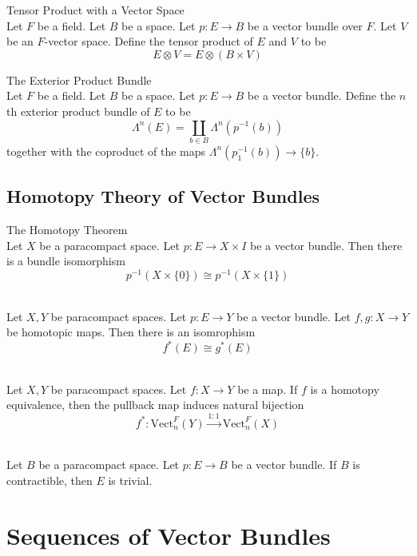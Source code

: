 \documentclass[a4paper]{article}
\begin{document}
\begin{defn}{Tensor Product with a Vector Space}{}\\
Let $F$ be a field. Let $B$ be a space. Let $p:E\to B$ be a vector bundle over $F$. Let $V$ be an $F$-vector space. Define the tensor product of $E$ and $V$ to be $$E\otimes V=E\otimes(B\times V)$$
\end{defn}

\begin{defn}{The Exterior Product Bundle}{}\\
Let $F$ be a field. Let $B$ be a space. Let $p:E\to B$ be a vector bundle. Define the $n$th exterior product bundle of $E$ to be $$\Lambda^n(E)=\coprod_{b\in B}\Lambda^n(p^{-1}(b))$$  together with the coproduct of the maps $\Lambda^n(p_1^{-1}(b))\to\{b\}$. 
\end{defn}

\subsection{Homotopy Theory of Vector Bundles}
\begin{thm}{The Homotopy Theorem}{}\\
Let $X$ be a paracompact space. Let $p:E\to X\times I$ be a vector bundle. Then there is a bundle isomorphism $$p^{-1}(X\times\{0\})\cong p^{-1}(X\times\{1\})$$
\end{thm}

\begin{prp}{}{}\\
Let $X,Y$ be paracompact spaces. Let $p:E\to Y$ be a vector bundle. Let $f,g:X\to Y$ be homotopic maps. Then there is an isomrophism $$f^\ast(E)\cong g^\ast(E)$$
\end{prp}

\begin{crl}{}{}\\
Let $X,Y$ be paracompact spaces. Let $f:X\to Y$ be a map. If $f$ is a homotopy equivalence, then the pullback map induces natural bijection $$f^\ast:\text{Vect}_n^F(Y)\overset{1:1}{\to}\text{Vect}_n^F(X)$$
\end{crl}

\begin{crl}{}{}\\
Let $B$ be a paracompact space. Let $p:E\to B$ be a vector bundle. If $B$ is contractible, then $E$ is trivial. 
\end{crl}

\pagebreak
\section{Sequences of Vector Bundles}
\end{document}
